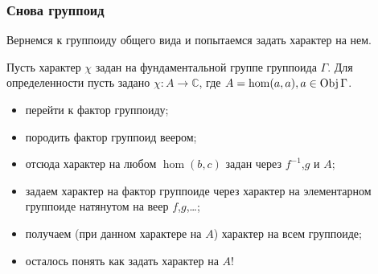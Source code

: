 \subsubsection{Снова группоид}
    Вернемся к группоиду общего вида и попытаемся задать характер на нем.

    Пусть характер $\chi$ задан на фундаментальной группе группоида $\Gamma$. 
    Для определенности пусть задано $\chi : A \to \mathbb{C}$, 
    где $A = \hom(a,a), a \in \operatorname*{Obj} \Gamma$.

    \begin{itemize}
        \item перейти к фактор группоиду;
        \item породить фактор группоид веером;
        \item отсюда характер на любом $\hom(b,c)$ задан через $f^{-1}$,$g$ и $A$;
        \item задаем характер на фактор группоиде через характер на элементарном группоиде натянутом на веер $f$,$g$,\dots;
        \item получаем (при данном характере на $A$) характер на всем группоиде;
        \item осталось понять как задать характер на $A$!
    \end{itemize}
    